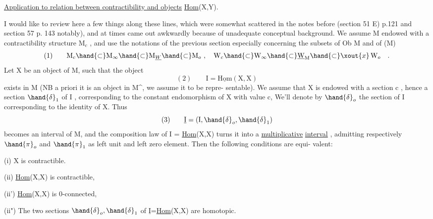 
\uline{Application to relation between contractibility and objects} \uline{Hom}(X,Y).

I would like to review here a few things along these lines, which were
somewhat scattered in the notes before (section 51 E) p.121 and section 57
p. 143 notably), and at times came out awkwardly because of unadequate
conceptual background. We assume M endowed with a contractibility structure
$\mathrm{M}_c$ , and use the notations of the previous section\unsure{;|,} especially concerning
the subsets of Ob M and of (M)
\[ (1) \qquad \mathrm{M}_c \hand{\subset} \mathrm{M}_\infty \hand{\subset} \mathrm{M}_{\underline{W}} \hand{\subset} \mathrm{M}_o \ , \quad \mathrm{W}_c \hand{\subset} \mathrm{W}_\infty \hand{\subset} \underline{\mathrm{W}}_{\mathrm{M}} \hand{\subset} \xout{x}\, \mathrm{W}_o \quad . \]
Let X be an object of M, such that the object 
\[ (2) \qquad \mathrm{I} = \underline{\mathrm{Hom}}(\mathrm{X},\mathrm{X}) \]
exists in M (NB a priori it is an object in M\^{}, we assume it to be repre-%
sentable). We assume that X is endowed with a section c , hence a section
 $\hand{\delta}_1$ of I , corresponding to the constant endomorphism of X with value c,
We'll denote by $\hand{\delta}_o$ the section of I corresponding to the identity of X.
Thus
\[ (3) \qquad \underline{\mathrm{I}} = (\mathrm{I},\hand{\delta}_o,\hand{\delta}_1) \]
becomes an interval of M, and the composition law of I = \uline{Hom}(X,X) turns
it into a \uline{multiplicative} \uline{interval} , admitting respectively $\hand{\pi}_o$ and $\hand{\pi}_1$ as
left unit and left zero element. Then the following conditions are equi-%
valent:

(i) X is contractible.

(ii) \uline{Hom}(X,X) is contractible, 

(ii') \uline{Hom}(X,X) is 0-connected, 

(ii")  The two sections $\hand{\delta}_o,\hand{\delta}_1$ of $\underline{\mathrm{I}}$=\uline{Hom}(X,X) are homotopic.

